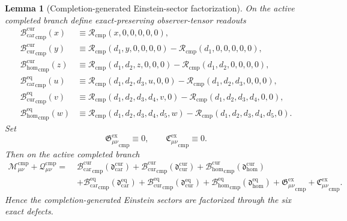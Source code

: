 \documentclass[11pt]{article}
\newcommand{\CompMix}{\mathcal M_{\mu\nu}^{\mathrm{cmp}}}
\newcommand{\CompQuad}{\mathcal Q_{\mu\nu}^{\mathrm{cmp}}}
\newcommand{\GaugeExact}{\mathfrak G_{\mu\nu}^{\mathrm{ex}}}
\newcommand{\ConstraintExact}{\mathfrak C_{\mu\nu}^{\mathrm{ex}}}
\newcommand{\TensorCurrentBridge}{\mathcal B_{\mathrm{car}}^{\mathrm{cur}}}
\newcommand{\CurCurrentBridge}{\mathcal B_{\mathrm{cur}}^{\mathrm{cur}}}
\newcommand{\HomCurrentBridge}{\mathcal B_{\mathrm{hom}}^{\mathrm{cur}}}
\newcommand{\TensorEqBridge}{\mathcal B_{\mathrm{car}}^{\mathrm{eq}}}
\newcommand{\CurEqBridge}{\mathcal B_{\mathrm{cur}}^{\mathrm{eq}}}
\newcommand{\HomEqBridge}{\mathcal B_{\mathrm{hom}}^{\mathrm{eq}}}
\newcommand{\CompletionRead}{\mathscr R_{\mathrm{cmp}}}
\newtheorem{lemma}{Lemma}
\begin{document}
\begin{lemma}[Completion-generated Einstein-sector factorization]
\label{lem:direct_completion}
On the active completed branch define exact-preserving observer-tensor readouts
\[
\begin{aligned}
{\TensorCurrentBridge}_{\mathrm{cmp}}(x)
&\equiv
\CompletionRead(x,0,0,0,0,0),
\\
{\CurCurrentBridge}_{\mathrm{cmp}}(y)
&\equiv
\CompletionRead(d_1,y,0,0,0,0)
-\CompletionRead(d_1,0,0,0,0,0),
\\
{\HomCurrentBridge}_{\mathrm{cmp}}(z)
&\equiv
\CompletionRead(d_1,d_2,z,0,0,0)
-\CompletionRead(d_1,d_2,0,0,0,0),
\\
{\TensorEqBridge}_{\mathrm{cmp}}(u)
&\equiv
\CompletionRead(d_1,d_2,d_3,u,0,0)
-\CompletionRead(d_1,d_2,d_3,0,0,0),
\\
{\CurEqBridge}_{\mathrm{cmp}}(v)
&\equiv
\CompletionRead(d_1,d_2,d_3,d_4,v,0)
-\CompletionRead(d_1,d_2,d_3,d_4,0,0),
\\
{\HomEqBridge}_{\mathrm{cmp}}(w)
&\equiv
\CompletionRead(d_1,d_2,d_3,d_4,d_5,w)
-\CompletionRead(d_1,d_2,d_3,d_4,d_5,0).
\end{aligned}
\]
Set
\[
{\GaugeExact}_{\mathrm{cmp}}\equiv 0,
\qquad
{\ConstraintExact}_{\mathrm{cmp}}\equiv 0.
\]
Then on the active completed branch
\begin{equation}
\begin{aligned}
\CompMix+\CompQuad
=\;&
{\TensorCurrentBridge}_{\mathrm{cmp}}\!\left(\mathfrak d_{\mathrm{car}}^{\mathrm{cur}}\right)
+{\CurCurrentBridge}_{\mathrm{cmp}}\!\left(\mathfrak d_{\mathrm{cur}}^{\mathrm{cur}}\right)
+{\HomCurrentBridge}_{\mathrm{cmp}}\!\left(\mathfrak d_{\mathrm{hom}}^{\mathrm{cur}}\right)
\\
&+{\TensorEqBridge}_{\mathrm{cmp}}\!\left(\mathfrak d_{\mathrm{car}}^{\mathrm{eq}}\right)
+{\CurEqBridge}_{\mathrm{cmp}}\!\left(\mathfrak d_{\mathrm{cur}}^{\mathrm{eq}}\right)
+{\HomEqBridge}_{\mathrm{cmp}}\!\left(\mathfrak d_{\mathrm{hom}}^{\mathrm{eq}}\right)
+{\GaugeExact}_{\mathrm{cmp}}+{\ConstraintExact}_{\mathrm{cmp}}.
\end{aligned}
\label{eq:direct_bridge_completion}
\end{equation}
Hence the completion-generated Einstein sectors are factorized through the six exact defects.
\end{lemma}
\end{document}
